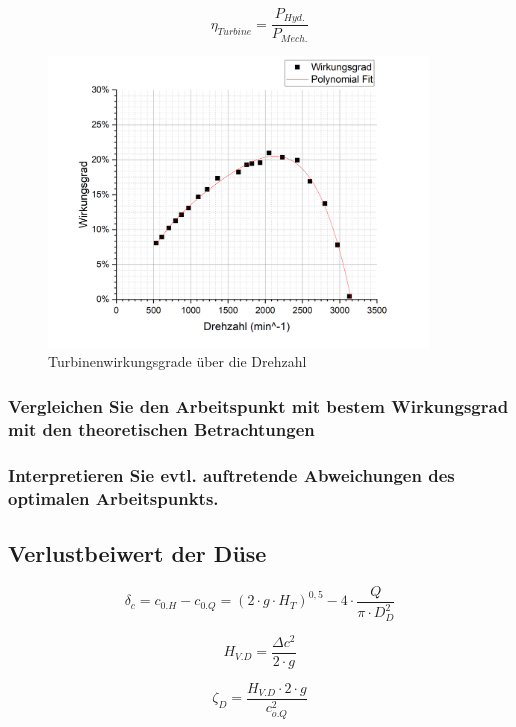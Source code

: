 \begin{equation}
  \eta_{Turbine} = \frac{P_{Hyd.}}{P_{Mech.}}
  \label{eq:230512_Turbinenwirkungsgrad}
\end{equation}

\begin{figure}[H]
  \centering
  \includegraphics[width=0.9\textwidth]{Abbildungen/Wirkungsgrade.png}
  \caption{Turbinenwirkungsgrade über die Drehzahl}
  \label{fig:230514_Wirkungsgrade}
\end{figure}

\subsubsection{Vergleichen Sie den Arbeitspunkt mit bestem Wirkungsgrad mit den theoretischen Betrachtungen}
\subsubsection{Interpretieren Sie evtl. auftretende Abweichungen des optimalen Arbeitspunkts.}

\subsection{Verlustbeiwert der Düse}
\begin{equation}
\delta_c = c_{0.H} - c_{0.Q} = ( 2\cdot g \cdot H_T)^{0,5} - 4\cdot \frac{Q}{\pi \cdot D_D^2}
\end{equation}

\begin{equation}
H_{V.D} = \frac{\Delta c^2}{2\cdot g}
\end{equation}

\begin{equation}
\zeta_D = \frac{H_{V.D} \cdot 2 \cdot g}{c_{o.Q}^2}
\end{equation}